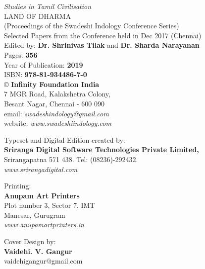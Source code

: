 \thispagestyle{empty}

 \textit{Studies in Tamil Civilisation}\\
 LAND OF DHARMA\\ 
 (Proceedings of the Swadeshi Indology Conference Series)\\
 Selected Papers from the Conference held in Dec 2017 (Chennai)\\
 Edited by: \textbf{Dr. Shrinivas Tilak} and \textbf{Dr. Sharda Narayanan}\\

 Pages: \textbf{356}\\
 Year of Publication: \textbf{2019}\\
 ISBN: \textbf{978-81-934486-7-0}\\

 © \textbf{Infinity Foundation India}\\
 7 MGR Road, Kalakshetra Colony,\\
 Besant Nagar, Chennai - 600 090\\
 email: \textit{swadeshindology@gmail.com}\\
 website: \textit{www.swadeshiindology.com}

 Typeset and Digital Edition created by:\\\textbf{Sriranga Digital Software Technologies Private Limited,}\\
 Srirangapatna 571 438. Tel: (08236)-292432.\\\textit{www.srirangadigital.com}

 Printing:\\\textbf{Anupam Art Printers}\\
 Plot number 3, Sector 7, IMT\\
 Manesar, Gurugram\\\textit{www.anupamartprinters.in}

 Cover Design by:\\\textbf{Vaidehi. V. Gangur}\\
 vaidehigangur@gmail.com

